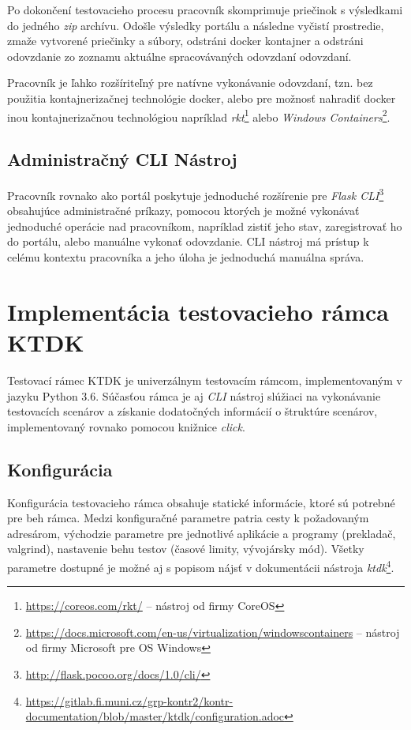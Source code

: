 \documentclass[
  digital, %
  twoside, %
  table,   %
  lof,     %
  lot,     %
]{fithesis3}
\begin{document}
Po dokončení testovacieho procesu pracovník skomprimuje priečinok s výsledkami do jedného \emph{zip} archívu. Odošle výsledky portálu a následne vyčistí prostredie, zmaže vytvorené priečinky a súbory, odstráni docker kontajner a odstráni odovzdanie zo zoznamu aktuálne spracovávaných odovzdaní odovzdaní.

Pracovník je ľahko rozšíriteľný pre natívne vykonávanie odovzdaní, tzn. bez použitia kontajnerizačnej technológie docker, alebo pre možnosť nahradiť docker inou kontajnerizačnou technológiou napríklad \emph{rkt}\footnote{\url{https://coreos.com/rkt/} -- nástroj od firmy CoreOS} alebo \emph{Windows Containers}\footnote{\url{https://docs.microsoft.com/en-us/virtualization/windowscontainers} -- nástroj od firmy Microsoft pre OS Windows}.

\subsection{Administračný CLI Nástroj}

Pracovník rovnako ako portál poskytuje jednoduché rozšírenie pre \emph{Flask CLI}\footnote{\url{http://flask.pocoo.org/docs/1.0/cli/}} obsahujúce administračné príkazy, pomocou ktorých je možné vykonávať jednoduché operácie nad pracovníkom, napríklad zistiť jeho stav, zaregistrovať ho do portálu, alebo manuálne vykonať odovzdanie. CLI nástroj má prístup k celému kontextu pracovníka a jeho úloha je jednoduchá manuálna správa.


\section{Implementácia testovacieho rámca KTDK}

Testovací rámec KTDK je univerzálnym testovacím rámcom, implementovaným v jazyku Python 3.6. Súčasťou rámca je aj \emph{CLI} nástroj slúžiaci na vykonávanie testovacích scenárov a získanie dodatočných informácií o štruktúre scenárov, implementovaný rovnako pomocou knižnice \emph{click}.

\subsection{Konfigurácia}

Konfigurácia testovacieho rámca obsahuje statické informácie, ktoré sú potrebné pre beh rámca. Medzi konfiguračné parametre patria cesty k požadovaným adresárom,
východzie parametre pre jednotlivé aplikácie a programy (prekladač, valgrind), nastavenie behu testov (časové limity, vývojársky mód). Všetky parametre dostupné je možné aj s popisom nájsť v dokumentácii nástroja \emph{ktdk}\footnote{\url{https://gitlab.fi.muni.cz/grp-kontr2/kontr-documentation/blob/master/ktdk/configuration.adoc}}.
\end{document}
